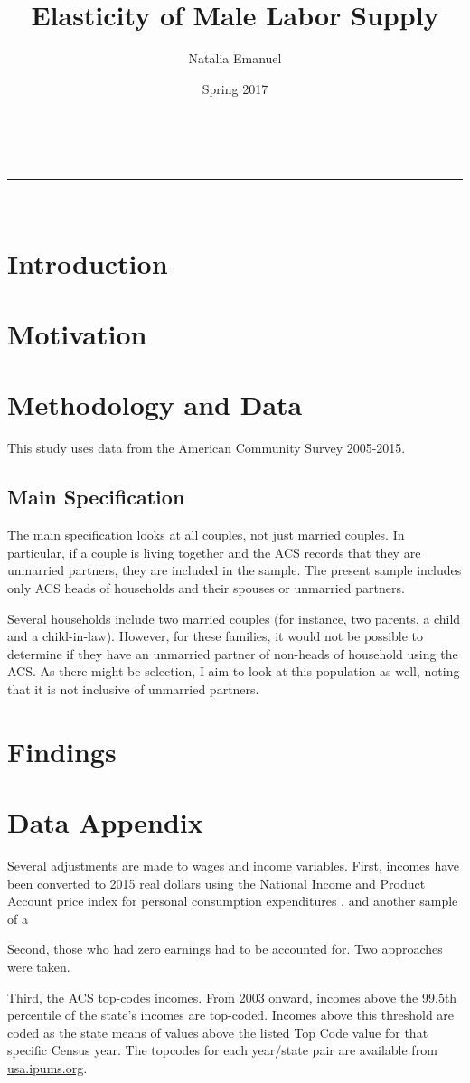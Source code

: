 \documentclass[11pt]{article}
\makeatletter
\renewcommand{\maketitle}{
\begin{center}
\vspace{2ex}
{\huge \textsc{\@title}}
\vspace{1ex}
\\
\rule{\linewidth}{0.5pt}\\
\@author \hfill \@date
\vspace{3ex}
\end{center}
}
\makeatother
\begin{document}
\title{Elasticity of Male Labor Supply}

\author{Natalia Emanuel}

\date{Spring 2017}

\maketitle

\section{Introduction}
\section{Motivation}
\section{Methodology and Data}
This study uses data from the American Community Survey 2005-2015. 

\subsection{Main Specification}
The main specification looks at all couples, not just married couples. In particular, if a couple is living together and the ACS records that they are unmarried partners, they are included in the sample. The present sample includes only ACS heads of households and their spouses or unmarried partners. 

Several households include two married couples (for instance, two parents, a child and a child-in-law). However, for these families, it would not be possible to determine if they have an unmarried partner of non-heads of household using the ACS. As there might be selection, I aim to look at this population as well, noting that it is not inclusive of unmarried partners.

\section{Findings}

\section{Data Appendix}
Several adjustments are made to wages and income variables. First, incomes have been converted to 2015 real dollars using the National Income and Product Account price index for personal consumption expenditures \parencite{fred_pcepi}. and another sample of a \parencite{Heckman79}

Second, those who had zero earnings had to be accounted for. Two approaches were taken.

Third, the ACS top-codes incomes. From 2003 onward, incomes above the 99.5th percentile of the state's incomes are top-coded. Incomes above this threshold are coded as the state means of values above the listed Top Code value for that specific Census year. The topcodes for each year/state pair are available from \href{https://usa.ipums.org/usa-action/variables/INCWAGE#codes_section}{usa.ipums.org}.

\printbibliography
\end{document}
